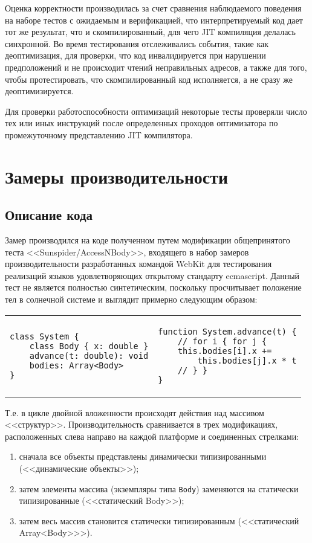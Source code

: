 \documentclass[times
]{itmo-student-thesis}
\begin{document}
Оценка корректности производилась за счет сравнения наблюдаемого поведения на наборе тестов с ожидаемым и верификацией, что интерпретируемый код дает тот же результат, что и скомпилированный, для чего JIT компиляция делалась синхронной. Во время тестирования отслеживались события, такие как деоптимизация, для проверки, что код инвалидируется при нарушении предположений и не происходит чтений неправильных адресов, а также для того, чтобы протестировать, что скомпилированный код исполняется, а не сразу же деоптимизируется.

Для проверки работоспособности оптимизаций некоторые тесты проверяли число тех или иных инструкций после определенных проходов оптимизатора по промежуточному представлению JIT компилятора.

\section{Замеры производительности}\label{sec:sunspider}
\subsection{Описание кода}
Замер производился на коде полученном путем модификации общепринятого теста <<Sunspider/AccessNBody>>, входящего в набор замеров производительности разработанных командой WebKit для тестирования реализаций языков удовлетворяющих открытому стандарту ecmascript. Данный тест не является полностью синтетическим, поскольку просчитывает положение тел в солнечной системе и выглядит примерно следующим образом:

\begin{center}
\begin{tabular}[t]{p{}|p{}}
\begin{lstlisting}
class System {
	class Body { x: double }
	advance(t: double): void
	bodies: Array<Body>
}
\end{lstlisting} &
\begin{lstlisting}
function System.advance(t) {
	// for i { for j {
	this.bodies[i].x +=
		this.bodies[j].x * t
	// } }
}
\end{lstlisting}
\end{tabular}
\end{center}

Т.е. в цикле двойной вложенности происходят действия над массивом <<структур>>. Производительность сравнивается в трех модификациях, расположенных слева направо на каждой платформе и соединенных стрелками:
\begin{enumerate}
	\item сначала все объекты представлены динамически типизированными (<<динамические объекты>>);
	\item затем элементы массива (экземпляры типа \texttt{Body}) заменяются на статически типизированные (<<статический Body>>);
	\item затем весь массив становится статически типизированным (<<статический Array<Body>>>).
\end{enumerate}
\end{document}
